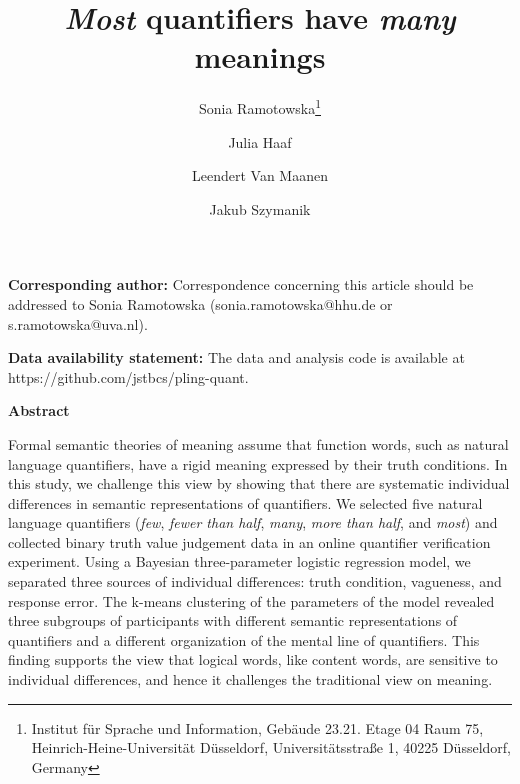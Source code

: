 \documentclass{article}
\providecommand{\corrauthor}[1]
{
  \small	
  \textbf{{Corresponding author:}} #1
}
\begin{document}
%

\begin{titlepage}
\title{\textit{Most} quantifiers have \textit{many} meanings}


\author[a]{Sonia Ramotowska\footnote{Institut für Sprache und Information, Gebäude 23.21. Etage 04 Raum 75, Heinrich-Heine-Universität Düsseldorf, Universitätsstraße 1, 40225 Düsseldorf, Germany}}
\author[b]{Julia Haaf}
\author[c]{Leendert Van Maanen}
\author[a]{Jakub Szymanik}
\date{}

%
\maketitle    %
\vspace{6cm}
\corrauthor{Correspondence concerning this article should be addressed to Sonia Ramotowska (sonia.ramotowska@hhu.de or s.ramotowska@uva.nl).}

\vspace{1cm}
\textbf{Data availability statement:} The data and analysis code is available at https://github.com/jstbcs/pling-quant.
\end{titlepage}

\vspace{1cm}
\textbf{Abstract}

Formal semantic theories of meaning assume that function words, such as natural language quantifiers, have a rigid meaning expressed by their truth conditions. In this study, we challenge this view by showing that there are systematic individual differences in semantic representations of quantifiers. We selected five natural language quantifiers (\textit{few}, \textit{fewer than half}, \textit{many}, \textit{more than half}, and \textit{most}) and collected binary truth value judgement data in an online quantifier verification experiment. Using a Bayesian three-parameter logistic regression model, we separated three sources of individual differences: truth condition, vagueness, and response error. The k-means clustering of the parameters of the model revealed three subgroups of participants with different semantic representations of quantifiers and a different organization of the mental line of quantifiers. This finding supports the view that logical words, like content words, are sensitive to individual differences, and hence it challenges the traditional view on meaning.
\end{document}
